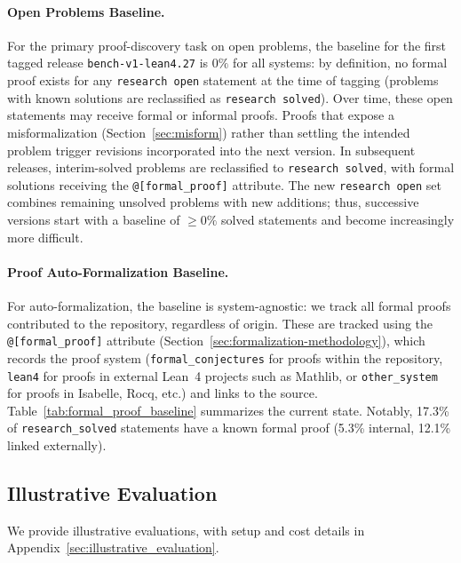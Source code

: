 


\paragraph{Open Problems Baseline.}
For the primary proof-discovery task on open problems, the baseline for the first tagged release \texttt{bench-v1-lean4.27} is $0\%$ for all systems: by definition, no formal proof exists for any \texttt{research open} statement at the time of tagging (problems with known solutions are reclassified as \texttt{research solved}).
Over time, these open statements may receive formal or informal proofs.
Proofs that expose a misformalization (Section~\ref{sec:misform}) rather than settling the intended problem trigger revisions incorporated into the next version.
In subsequent releases, interim-solved problems are reclassified to \texttt{research solved}, with formal solutions receiving the \lstinline{@[formal_proof]} attribute.
The new \texttt{research open} set combines remaining unsolved problems with new additions; thus, successive versions start with a baseline of $\geq 0\%$ solved statements and become increasingly more difficult.

\paragraph{Proof Auto-Formalization Baseline.}
For auto-formalization, the baseline is system-agnostic: we track all formal proofs contributed to the repository, regardless of origin.
These are tracked using the \lstinline{@[formal_proof]} attribute (Section~\ref{sec:formalization-methodology}), which records the proof system (\texttt{formal\_conjectures} for proofs within the repository, \texttt{lean4} for proofs in external Lean~4 projects such as Mathlib, or \texttt{other\_system} for proofs in Isabelle, Rocq, etc.) and links to the source.
Table~\ref{tab:formal_proof_baseline} summarizes the current state. Notably, 17.3\% of \texttt{research\_solved} statements have a known formal proof (5.3\% internal, 12.1\% linked externally).


\subsection{Illustrative Evaluation}\label{sec:experimental_results}


We provide illustrative evaluations, with setup and cost details in Appendix~\ref{sec:illustrative_evaluation}.



